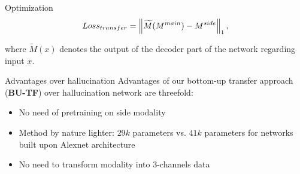 \begin{frame}{Optimization}
	\begin{equation}
			Loss_{transfer} = \left\lVert\widetilde{M}(M^{main}) - M^{side}\right\rVert_1,
	\end{equation}
	
	where $\widetilde{M}(x)$ denotes the output of the decoder part of the network regarding input $x$.
	
	
	
\end{frame}

\begin{frame}{Advantages over hallucination}
	Advantages of our bottom-up transfer approach (\textbf{BU-TF}) over hallucination network are threefold: 
	\begin{itemize}
		\item<1-> No need of pretraining on side modality
		\item<2-> Method by nature lighter: $29k$ parameters vs. $41k$ parameters for networks built upon Alexnet architecture
		\item<3> No need to transform modality into 3-channels data
	\end{itemize}
	

\end{frame}
